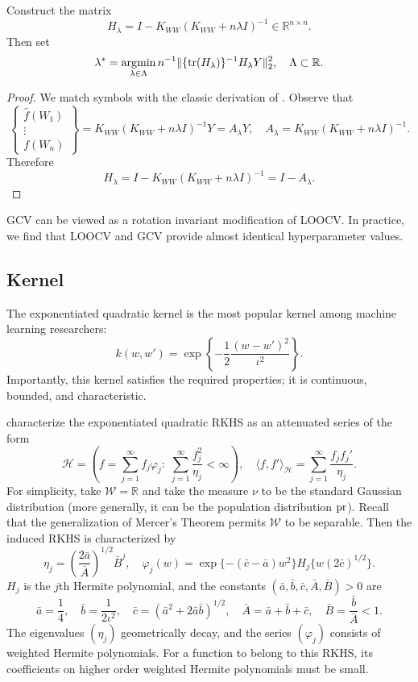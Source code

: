 \begin{algorithm}
Construct the matrix
$$
H_{\lambda}= I -K_{WW}(K_{WW}+n\lambda  I )^{-1}\in\mathbb{R}^{n\times n}.
$$
Then set
$$
\lambda^*=\operatorname*{\arg\!\min}_{\lambda \in\Lambda} n^{-1}\|\{\text{\normalfont tr}(H_{\lambda})\}^{-1} H_{\lambda} Y\|_2^2,\quad \Lambda\subset\mathbb{R}.
$$
\end{algorithm}

\begin{proof}
We match symbols with the classic derivation of \cite{craven1978smoothing}. Observe that
$$
\begin{Bmatrix} \hat{f}(W_1) \\ \vdots \\ f(W_n) \end{Bmatrix}=K_{WW}(K_{WW}+n\lambda  I )^{-1}Y=A_{\lambda}Y,\quad A_{\lambda}=K_{WW}(K_{WW}+n\lambda  I )^{-1}.
$$
Therefore
$$
H_{\lambda}= I -K_{WW}(K_{WW}+n\lambda  I )^{-1}= I -A_{\lambda}.
$$
\end{proof}

GCV can be viewed as a rotation invariant modification of LOOCV. In practice, we find that LOOCV and GCV provide almost identical hyperparameter values.

\subsection{Kernel}

The exponentiated quadratic kernel is the most popular kernel among machine learning researchers:
$$
k(w,w')=\exp\left\{-\frac{1}{2}\frac{(w-w')^2}{\iota^2}\right\}.
$$
Importantly, this kernel satisfies the required properties; it is continuous, bounded, and characteristic.

\cite[Section 4.3]{williams2006gaussian} characterize the exponentiated quadratic RKHS as an attenuated series of the form
$$
\mathcal{H}=\left(f=\sum_{j=1}^{\infty}f_j\varphi_j:\;\sum_{j=1}^{\infty} \frac{f_j^2}{\eta_j}<\infty\right),\quad \langle f,f' \rangle_{\mathcal{H}}=\sum_{j=1}^{\infty} \frac{f_jf_j'}{\eta_j}.
$$
For simplicity, take $\mathcal{W}=\mathbb{R}$ and take the measure $\nu$ to be the standard Gaussian distribution (more generally, it can be the population distribution $\text{\normalfont pr}$). Recall that the generalization of Mercer's Theorem permits $\mathcal{W}$ to be separable. Then the induced RKHS is characterized by
$$
\eta_j=\left(\frac{2\bar{a}}{\bar{A}}\right)^{1/2}\bar{B}^j,\quad \varphi_j(w)=\exp\{-(\bar{c}-\bar{a})w^2\}H_j\{w(2\bar{c})^{1/2}\}.%
$$
$H_j$ is the $j$th Hermite polynomial, and the constants $(\bar{a},\bar{b},\bar{c},\bar{A},\bar{B})>0$ are
$$
\bar{a}=\frac{1}{4},\quad \bar{b}=\frac{1}{2\iota^2},\quad \bar{c}=(\bar{a}^2+2\bar{a}\bar{b})^{1/2},\quad \bar{A}=\bar{a}+\bar{b}+\bar{c},\quad \bar{B}=\frac{\bar{b}}{\bar{A}}<1.
$$
The eigenvalues $(\eta_j)$ geometrically decay, and the series $(\varphi_j)$ consists of weighted Hermite polynomials. For a function to belong to this RKHS, its coefficients on higher order weighted Hermite polynomials must be small.

